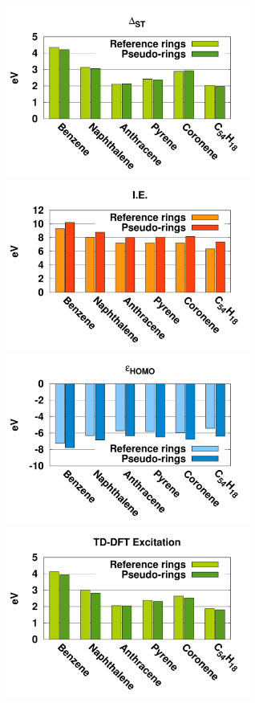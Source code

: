 \documentclass[12pt]{article}
\begin{document}
\begin{figure}
\begin{center}
\includegraphics[width=8cm]{ring_pbe0_st}
\includegraphics[width=8cm]{ring_pbe0_ie}
\includegraphics[width=8cm]{ring_pbe0_homo}
\includegraphics[width=8cm]{ring_pbe0_tddft}

\end{center}
\end{figure}
\end{document}
